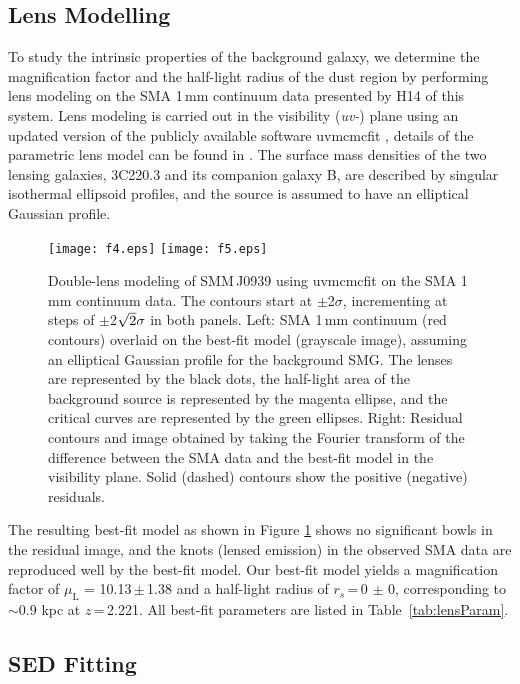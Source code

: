 \documentclass[iop, revtex4]{emulateapj}
\begin{document}
\subsection{Lens Modelling} \label{sec:Lens}
To study the intrinsic properties of the background galaxy, we determine the magnification factor and the half-light radius of the dust region by performing
lens modeling on the SMA 1\,mm continuum data presented by H14 of this system.
Lens modeling is carried out in the visibility
({\it uv-}) plane using an updated version of the publicly available software {\sc uvmcmcfit} \citep{uvmcmcfit15a},
details of the parametric lens model can be found in \citet{Bussmann15a}.
The surface mass densities of the two lensing galaxies, 3C220.3 and its companion galaxy B, are described by singular isothermal ellipsoid profiles, and the source is assumed to have an
elliptical Gaussian profile. 
\begin{figure}[!tbpH]
\centering
\texttt{[image: f4.eps]}
\texttt{[image: f5.eps]}
\caption{Double-lens modeling of SMM\,J0939 using {\sc uvmcmcfit} on the SMA 1\,mm continuum data.
The contours start at $\pm$2$\sigma$, incrementing at
steps of $\pm$2$\sqrt{\rm 2}\sigma$ in both panels. Left: SMA 1\,mm continuum (red contours) overlaid on the best-fit model (grayscale image), assuming an elliptical Gaussian profile for the background SMG. The lenses are represented by the black dots, the half-light area of the background source is represented by the magenta ellipse, and the critical curves are represented by the green ellipses.
Right: Residual contours and image obtained by taking the Fourier transform of the difference between the SMA data and the best-fit model in the visibility plane. Solid (dashed) contours show the positive (negative) residuals.\label{fig:lens}}
\end{figure}

The resulting best-fit model as shown in Figure\,\,\ref{fig:lens} shows no significant bowls in the residual
image, and the knots (lensed emission) in the observed SMA data are reproduced well by the best-fit model.
 Our best-fit model yields a magnification
factor of $\mu_\textrm{L}$ = 10.13\,$\pm$\,1.38
and a half-light radius of $r_{s}$\,=\,0 $\pm$ 0, corresponding to $\sim$0.9 kpc at $z$\,=\,2.221.
All best-fit
parameters are listed in Table~\ref{tab:lensParam}.


\subsection{SED Fitting} \label{sec:SED}
\end{document}
